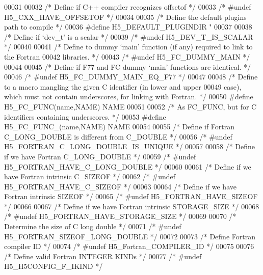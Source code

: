 \begin{DoxyCode}
00031 
00032 \textcolor{comment}{/* Define if C++ compiler recognizes offsetof */}
00033 \textcolor{comment}{/* #undef H5\_CXX\_HAVE\_OFFSETOF */}
00034 
00035 \textcolor{comment}{/* Define the default plugins path to compile */}
00036 \textcolor{preprocessor}{#define H5\_DEFAULT\_PLUGINDIR "%
00037 
00038 \textcolor{comment}{/* Define if `dev\_t' is a scalar */}
00039 \textcolor{comment}{/* #undef H5\_DEV\_T\_IS\_SCALAR */}
00040 
00041 \textcolor{comment}{/* Define to dummy `main' function (if any) required to link to the Fortran}
00042 \textcolor{comment}{   libraries. */}
00043 \textcolor{comment}{/* #undef H5\_FC\_DUMMY\_MAIN */}
00044 
00045 \textcolor{comment}{/* Define if F77 and FC dummy `main' functions are identical. */}
00046 \textcolor{comment}{/* #undef H5\_FC\_DUMMY\_MAIN\_EQ\_F77 */}
00047 
00048 \textcolor{comment}{/* Define to a macro mangling the given C identifier (in lower and upper}
00049 \textcolor{comment}{   case), which must not contain underscores, for linking with Fortran. */}
00050 \textcolor{preprocessor}{#define H5\_FC\_FUNC(name,NAME) NAME}
00051 
00052 \textcolor{comment}{/* As FC\_FUNC, but for C identifiers containing underscores. */}
00053 \textcolor{preprocessor}{#define H5\_FC\_FUNC\_(name,NAME) NAME}
00054 
00055 \textcolor{comment}{/* Define if Fortran C\_LONG\_DOUBLE is different from C\_DOUBLE */}
00056 \textcolor{comment}{/* #undef H5\_FORTRAN\_C\_LONG\_DOUBLE\_IS\_UNIQUE */}
00057 
00058 \textcolor{comment}{/* Define if we have Fortran C\_LONG\_DOUBLE */}
00059 \textcolor{comment}{/* #undef H5\_FORTRAN\_HAVE\_C\_LONG\_DOUBLE */}
00060 
00061 \textcolor{comment}{/* Define if we have Fortran intrinsic C\_SIZEOF */}
00062 \textcolor{comment}{/* #undef H5\_FORTRAN\_HAVE\_C\_SIZEOF */}
00063 
00064 \textcolor{comment}{/* Define if we have Fortran intrinsic SIZEOF */}
00065 \textcolor{comment}{/* #undef H5\_FORTRAN\_HAVE\_SIZEOF */}
00066 
00067 \textcolor{comment}{/* Define if we have Fortran intrinsic STORAGE\_SIZE */}
00068 \textcolor{comment}{/* #undef H5\_FORTRAN\_HAVE\_STORAGE\_SIZE */}
00069 
00070 \textcolor{comment}{/* Determine the size of C long double */}
00071 \textcolor{comment}{/* #undef H5\_FORTRAN\_SIZEOF\_LONG\_DOUBLE */}
00072 
00073 \textcolor{comment}{/* Define Fortran compiler ID */}
00074 \textcolor{comment}{/* #undef H5\_Fortran\_COMPILER\_ID */}
00075 
00076 \textcolor{comment}{/* Define valid Fortran INTEGER KINDs */}
00077 \textcolor{comment}{/* #undef H5\_H5CONFIG\_F\_IKIND */}
}
\end{DoxyCode}
